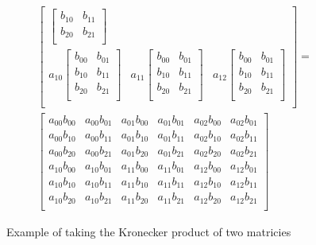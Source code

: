 \begin{figure}[H]
\begin{gather*}
\begin{bmatrix}
\begin{bmatrix}
                b_{10} & b_{11} \\
                b_{20} & b_{21} \\
            \end{bmatrix} \\
            a_{10}
            \begin{bmatrix}
                b_{00} & b_{01} \\
                b_{10} & b_{11} \\
                b_{20} & b_{21} \\
            \end{bmatrix} 
            & a_{11}\begin{bmatrix}
                b_{00} & b_{01} \\
                b_{10} & b_{11} \\
                b_{20} & b_{21} \\
            \end{bmatrix} 
            & a_{12}\begin{bmatrix}
                b_{00} & b_{01} \\
                b_{10} & b_{11} \\
                b_{20} & b_{21} \\
            \end{bmatrix} \\
        \end{bmatrix}
        =\\
        \begin{bmatrix}
            a_{00}b_{00} & a_{00}b_{01} & a_{01}b_{00} & a_{01}b_{01} & a_{02}b_{00} & a_{02}b_{01}\\
            a_{00}b_{10} & a_{00}b_{11} & a_{01}b_{10} & a_{01}b_{11} & a_{02}b_{10} & a_{02}b_{11}\\
            a_{00}b_{20} & a_{00}b_{21} & a_{01}b_{20} & a_{01}b_{21} & a_{02}b_{20} & a_{02}b_{21}\\
            a_{10}b_{00} & a_{10}b_{01} & a_{11}b_{00} & a_{11}b_{01} & a_{12}b_{00} & a_{12}b_{01}\\
            a_{10}b_{10} & a_{10}b_{11} & a_{11}b_{10} & a_{11}b_{11} & a_{12}b_{10} & a_{12}b_{11}\\
            a_{10}b_{20} & a_{10}b_{21} & a_{11}b_{20} & a_{11}b_{21} & a_{12}b_{20} & a_{12}b_{21}\\
        \end{bmatrix}
    \end{gather*}    
    \caption{Example of taking the Kronecker product of two matricies}
    \label{fig:Kronecker_example}
\end{figure}

